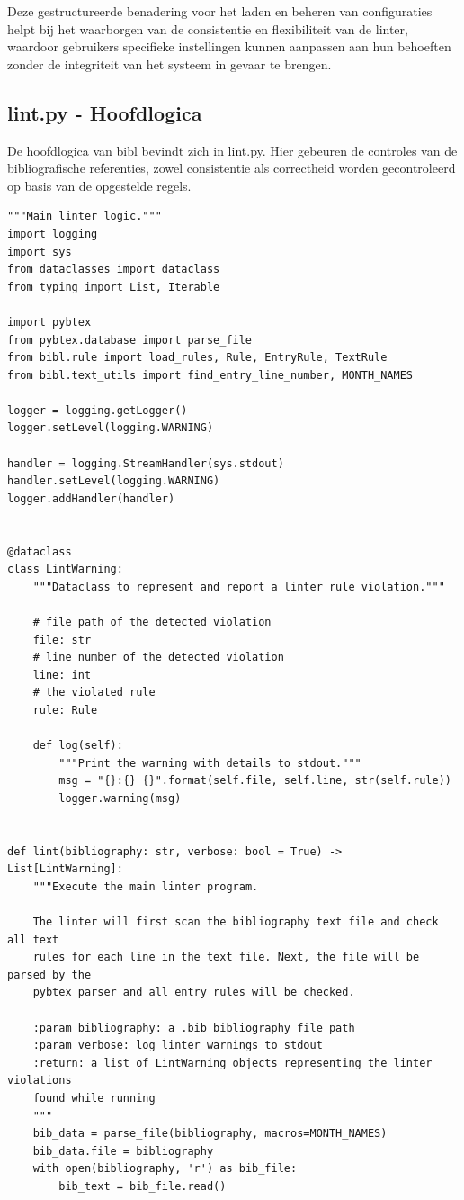 Deze gestructureerde benadering voor het laden en beheren van configuraties helpt bij het waarborgen van de consistentie en flexibiliteit van de linter, waardoor gebruikers specifieke instellingen kunnen aanpassen aan hun behoeften zonder de integriteit van het systeem in gevaar te brengen.
\subsection{lint.py - Hoofdlogica}

De hoofdlogica van bibl bevindt zich in lint.py. 
Hier gebeuren de controles van de bibliografische referenties, zowel consistentie als correctheid worden gecontroleerd op basis van de opgestelde regels.

\begin{verbatim}
"""Main linter logic."""
import logging
import sys
from dataclasses import dataclass
from typing import List, Iterable

import pybtex
from pybtex.database import parse_file
from bibl.rule import load_rules, Rule, EntryRule, TextRule
from bibl.text_utils import find_entry_line_number, MONTH_NAMES

logger = logging.getLogger()
logger.setLevel(logging.WARNING)

handler = logging.StreamHandler(sys.stdout)
handler.setLevel(logging.WARNING)
logger.addHandler(handler)


@dataclass
class LintWarning:
    """Dataclass to represent and report a linter rule violation."""

    # file path of the detected violation
    file: str
    # line number of the detected violation
    line: int
    # the violated rule
    rule: Rule

    def log(self):
        """Print the warning with details to stdout."""
        msg = "{}:{} {}".format(self.file, self.line, str(self.rule))
        logger.warning(msg)


def lint(bibliography: str, verbose: bool = True) -> List[LintWarning]:
    """Execute the main linter program.

    The linter will first scan the bibliography text file and check all text
    rules for each line in the text file. Next, the file will be parsed by the
    pybtex parser and all entry rules will be checked.

    :param bibliography: a .bib bibliography file path
    :param verbose: log linter warnings to stdout
    :return: a list of LintWarning objects representing the linter violations
    found while running
    """
    bib_data = parse_file(bibliography, macros=MONTH_NAMES)
    bib_data.file = bibliography
    with open(bibliography, 'r') as bib_file:
        bib_text = bib_file.read()


\end{verbatim}
